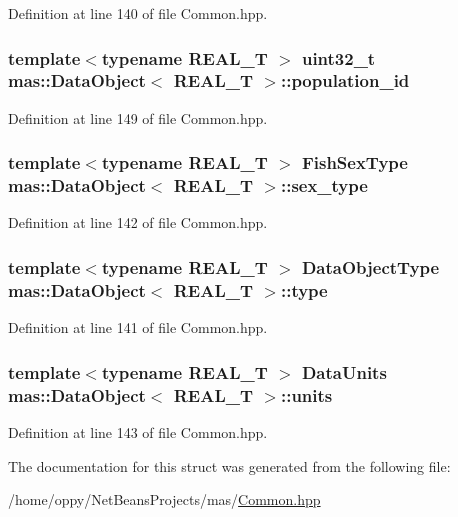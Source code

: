 Definition at line 140 of file Common.\-hpp.

\hypertarget{structmas_1_1_data_object_ae60deac02bbbc9ca0b0fc0faf8b34ce5}{
\subsubsection[{population\-\_\-id}]{\setlength{\rightskip}{0pt plus 5cm}template$<$typename R\-E\-A\-L\-\_\-\-T $>$ uint32\-\_\-t {\bf mas\-::\-Data\-Object}$<$ R\-E\-A\-L\-\_\-\-T $>$\-::population\-\_\-id}}\label{structmas_1_1_data_object_ae60deac02bbbc9ca0b0fc0faf8b34ce5}


Definition at line 149 of file Common.\-hpp.

\hypertarget{structmas_1_1_data_object_a33c8e663026364c72e23fa5d17b924e3}{
\subsubsection[{sex\-\_\-type}]{\setlength{\rightskip}{0pt plus 5cm}template$<$typename R\-E\-A\-L\-\_\-\-T $>$ {\bf Fish\-Sex\-Type} {\bf mas\-::\-Data\-Object}$<$ R\-E\-A\-L\-\_\-\-T $>$\-::sex\-\_\-type}}\label{structmas_1_1_data_object_a33c8e663026364c72e23fa5d17b924e3}


Definition at line 142 of file Common.\-hpp.

\hypertarget{structmas_1_1_data_object_a7cb55ace324439fd5c669d9c9e8bdb41}{
\subsubsection[{type}]{\setlength{\rightskip}{0pt plus 5cm}template$<$typename R\-E\-A\-L\-\_\-\-T $>$ {\bf Data\-Object\-Type} {\bf mas\-::\-Data\-Object}$<$ R\-E\-A\-L\-\_\-\-T $>$\-::type}}\label{structmas_1_1_data_object_a7cb55ace324439fd5c669d9c9e8bdb41}


Definition at line 141 of file Common.\-hpp.

\hypertarget{structmas_1_1_data_object_a110ce699c4ed8de93533118b35927413}{
\subsubsection[{units}]{\setlength{\rightskip}{0pt plus 5cm}template$<$typename R\-E\-A\-L\-\_\-\-T $>$ {\bf Data\-Units} {\bf mas\-::\-Data\-Object}$<$ R\-E\-A\-L\-\_\-\-T $>$\-::units}}\label{structmas_1_1_data_object_a110ce699c4ed8de93533118b35927413}


Definition at line 143 of file Common.\-hpp.



The documentation for this struct was generated from the following file\-:\begin{DoxyCompactItemize}
\item 
/home/oppy/\-Net\-Beans\-Projects/mas/\hyperlink{_common_8hpp}{Common.\-hpp}\end{DoxyCompactItemize}
